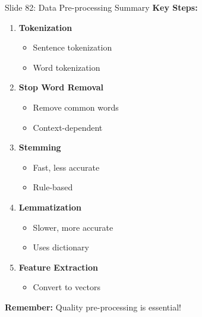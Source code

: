 \documentclass[8pt]{beamer}
\begin{document}
	\begin{frame}{Slide 82: Data Pre-processing Summary}
		\fontsize{6.5}{7.5}\selectfont
		\textbf{Key Steps:}
		\begin{enumerate}
			\item \textbf{Tokenization}
			\begin{itemize}
				\item Sentence tokenization
				\item Word tokenization
			\end{itemize}
			\item \textbf{Stop Word Removal}
			\begin{itemize}
				\item Remove common words
				\item Context-dependent
			\end{itemize}
			\item \textbf{Stemming}
			\begin{itemize}
				\item Fast, less accurate
				\item Rule-based
			\end{itemize}
			\item \textbf{Lemmatization}
			\begin{itemize}
				\item Slower, more accurate
				\item Uses dictionary
			\end{itemize}
			\item \textbf{Feature Extraction}
			\begin{itemize}
				\item Convert to vectors
			\end{itemize}
		\end{enumerate}
		
		\textcolor{myblue}{\textbf{Remember:}} Quality pre-processing is essential!
	\end{frame}
	
\end{document}
